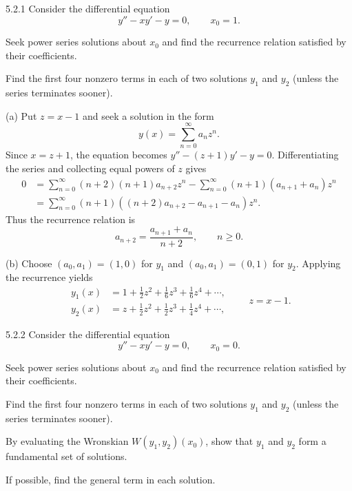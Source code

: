\documentclass[11pt,oneside]{article}
\begin{document}

\begin{problem}{5.2.1}
Consider the differential equation
\[
    y''-xy'-y=0, \qquad x_0=1.
\]
\begin{problemsubparts}
    \item Seek power series solutions about $x_0$ and find the recurrence relation satisfied by their coefficients.
    \item Find the first four nonzero terms in each of two solutions $y_1$ and $y_2$ (unless the series terminates sooner).
\end{problemsubparts}
\end{problem}

\begin{solution}
\noindent\textup{(a)} Put $z=x-1$ and seek a solution in the form
\[
    y(x)=\sum_{n=0}^{\infty}a_nz^n.
\]
Since $x=z+1$, the equation becomes $y''-(z+1)y'-y=0$. Differentiating the series and collecting equal powers of $z$ gives
\[
    \begin{aligned}
    0&=\sum_{n=0}^{\infty}(n+2)(n+1)a_{n+2}z^n
       -\sum_{n=0}^{\infty}(n+1)(a_{n+1}+a_n)z^n\\
     &=\sum_{n=0}^{\infty}(n+1)((n+2)a_{n+2}-a_{n+1}-a_n)z^n.
    \end{aligned}
\]
Thus the recurrence relation is
\[
    \boxed{a_{n+2}=\frac{a_{n+1}+a_n}{n+2}}, \qquad n\geq0.
\]

\noindent\textup{(b)} Choose $(a_0, a_1)=(1, 0)$ for $y_1$ and $(a_0, a_1)=(0, 1)$ for $y_2$. Applying the recurrence yields
\[
    \boxed{\begin{aligned}
    y_1(x)&=1+\frac12z^2+\frac16z^3+\frac16z^4+\cdots,\\
    y_2(x)&=z+\frac12z^2+\frac12z^3+\frac14z^4+\cdots,
    \end{aligned}}
    \qquad z=x-1.
\]
\end{solution}

\begin{problem}{5.2.2}
Consider the differential equation
\[
    y''-xy'-y=0, \qquad x_0=0.
\]
\begin{problemsubparts}
    \item Seek power series solutions about $x_0$ and find the recurrence relation satisfied by their coefficients.
    \item Find the first four nonzero terms in each of two solutions $y_1$ and $y_2$ (unless the series terminates sooner).
    \item By evaluating the Wronskian $W(y_1, y_2)(x_0)$, show that $y_1$ and $y_2$ form a fundamental set of solutions.
    \item If possible, find the general term in each solution.
\end{problemsubparts}
\end{problem}
\end{document}
